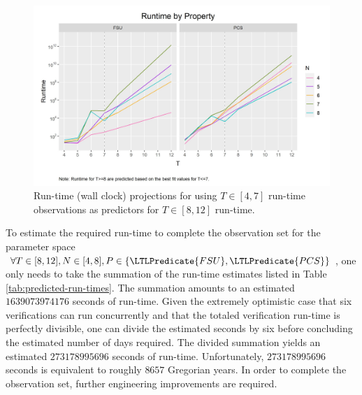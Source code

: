 \begin{figure}[ht!]
\centering
\caption[Runtime projections for ]{%
\label{fig:runtime-projections}%
Run-time (wall clock) projections for  using $T \in [4, 7]$ run-time observations as predictors for $T \in [8, 12]$ run-time.
}%
\includegraphics[width=\textwidth]{./figures/fsu-pcs-runtime-combined-preidcted.png}
\end{figure}

To estimate the required run-time to complete the observation set for the parameter space \(\forall T \in [8, 12], N \in [4, 8], P \in \{ \LTLPredicate{FSU}, \LTLPredicate{PCS} \}\), one only needs to take the summation of the run-time estimates listed in Table \ref{tab:predicted-run-times}.
The summation amounts to an estimated \(1639073974176\) seconds of run-time.
Given the extremely optimistic case that six verifications can run concurrently and that the totaled verification run-time is perfectly divisible, one can divide the estimated seconds by six before concluding the estimated number of days required.
The divided summation yields an estimated \(273178995696\) seconds of run-time.
Unfortunately, \(273178995696\) seconds is equivalent to roughly \(8657\) Gregorian years.
In order to complete the observation set, further engineering improvements are required.


